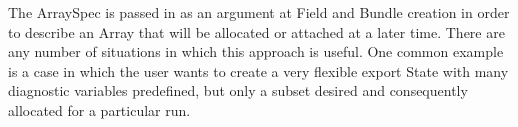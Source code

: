 

The ArraySpec is passed in as an argument at Field and 
Bundle creation in order to describe an Array that will 
be allocated or attached at a later time.  There are any
number of situations in which this approach is useful.  
One common example is a case in which the user wants to create
a very flexible export State with many diagnostic variables 
predefined, but only a subset desired and consequently 
allocated for a particular run.  


